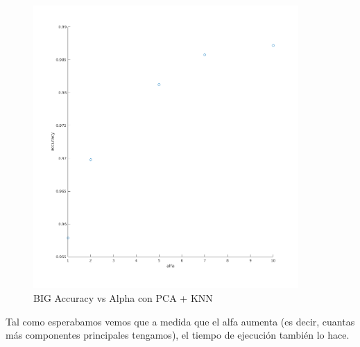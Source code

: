 \begin{figure}[H]
	\centering	\includegraphics[width=0.9\textwidth]{img/big_alfa_pca_accu.png}
	\caption{BIG Accuracy vs Alpha con PCA + KNN}
	\label{fig: BIG Accuracy vs Alpha con KNN + PCA}
\end{figure}



Tal como esperabamos vemos que a medida que el alfa aumenta (es decir, cuantas más componentes principales tengamos), el tiempo de ejecución también lo hace.

